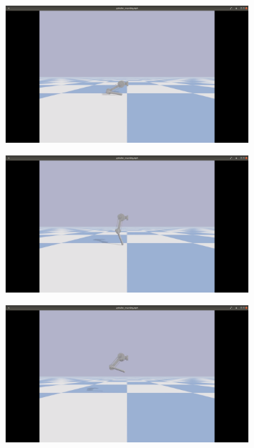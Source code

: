 \documentclass[onecolumn, letter paper]{report}
\begin{document}
\begin{figure}[htb!]
    \centering
    \begin{subfigure}{.24\textwidth}
    \includegraphics[width=\textwidth, trim={25cm 10cm 25cm 5cm}, clip]{figures/sim0.5m/s51.png}
    \end{subfigure}
    \begin{subfigure}{.24\textwidth}
    \includegraphics[width=\textwidth, trim={25cm 10cm 25cm 5cm}, clip]{figures/sim0.5m/s52.png}
    \end{subfigure}
    \begin{subfigure}{.24\textwidth}
    \includegraphics[width=\textwidth, trim={25cm 10cm 25cm 5cm}, clip]{figures/sim0.5m/s53.png}

\end{subfigure}
\end{figure}
\end{document}
